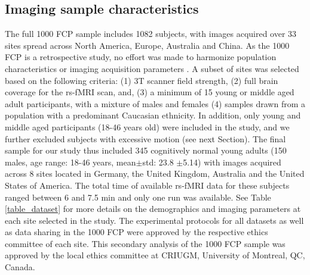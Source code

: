\documentclass[authoryear]{elsarticle}
\begin{document}
\subsection{Imaging sample characteristics}
The full 1000 FCP sample includes 1082 subjects, with images acquired over 33 sites spread across North America, Europe, Australia and China. As the 1000 FCP is a retrospective study, no effort was made to harmonize population characteristics or imaging acquisition parameters \citep{Biswal2010}. A subset of sites was selected based on the following criteria: (1) 3T scanner field strength, (2) full brain coverage for the rs-fMRI scan, and, (3) a minimum of 15 young or middle aged adult participants, with a mixture of males and females (4) samples drawn from a population with a predominant Caucasian ethnicity. In addition, only young and middle aged participants (18-46 years old) were included in the study, and we further excluded subjects with excessive motion (see next Section). The final sample for our study thus included 345 cognitively normal young adults (150 males, age range: 18-46 years, mean$\pm$std: 23.8 $\pm$5.14) with images acquired across 8 sites located in Germany, the United Kingdom, Australia and the United States of America. The total time of available rs-fMRI data for these subjects ranged between 6 and 7.5 min and only one run was available. See Table \ref{table_dataset} for more details on the demographics and imaging parameters at each site selected in the study.  The experimental protocols for all datasets as well as data sharing in the 1000 FCP were approved by the respective ethics committee of each site. This secondary analysis of the 1000 FCP sample was approved by the local ethics committee at CRIUGM, University of Montreal, QC, Canada.
\end{document}
